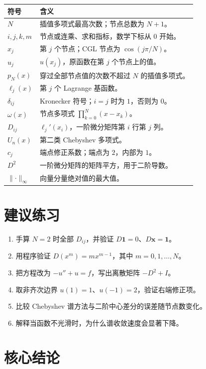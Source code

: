 \documentclass[11pt,a4paper]{ctexart}
\numberwithin{equation}{section}
\newcommand{\vect}[1]{\bm{#1}}
\begin{document}
\begin{longtable}{>{\centering\arraybackslash}p{}p{}}
\toprule
符号 & 含义\\
\midrule
\endhead
$N$ & 插值多项式最高次数；节点总数为 $N+1$。\\
$i,j,k,m$ & 节点或连乘、求和指标，数学下标从 $0$ 开始。\\
$x_j$ & 第 $j$ 个节点；CGL 节点为 $\cos(j\pi/N)$。\\
$u_j$ & $u(x_j)$，原函数在第 $j$ 个节点上的值。\\
$p_N(x)$ & 穿过全部节点值的次数不超过 $N$ 的插值多项式。\\
$\ell_j(x)$ & 第 $j$ 个 Lagrange 基函数。\\
$\delta_{ij}$ & Kronecker 符号；$i=j$ 时为 $1$，否则为 $0$。\\
$\omega(x)$ & 节点多项式 $\prod_{k=0}^N(x-x_k)$。\\
$D_{ij}$ & $\ell_j'(x_i)$，一阶微分矩阵第 $i$ 行第 $j$ 列。\\
$U_n(x)$ & 第二类 Chebyshev 多项式。\\
$c_j$ & 端点修正系数；端点为 $2$，内部为 $1$。\\
$D^2$ & 一阶微分矩阵的矩阵平方，用于二阶导数。\\
$\lVert\cdot\rVert_\infty$ & 向量分量绝对值的最大值。\\
\bottomrule
\end{longtable}

\section{建议练习}

\begin{enumerate}[label=\arabic*.]
  \item 手算 $N=2$ 时全部 $D_{ij}$，并验证 $D\vect{1}=0$、$D\vect{x}=\vect{1}$。
  \item 用程序验证 $D(x^m)=m x^{m-1}$，其中 $m=0,1,\ldots,N$。
  \item 把方程改为 $-u''+u=f$，写出离散矩阵 $-D^2+I$。
  \item 取非齐次边界 $u(1)=1$、$u(-1)=2$，验证右端修正项。
  \item 比较 Chebyshev 谱方法与二阶中心差分的误差随节点数变化。
  \item 解释当函数不光滑时，为什么谱收敛速度会显著下降。
\end{enumerate}

\section{核心结论}
\end{document}
